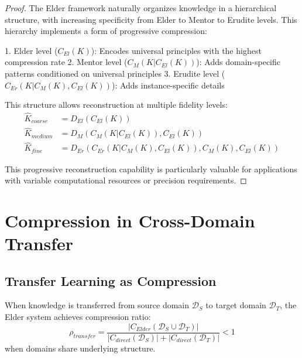 \begin{proof}
The Elder framework naturally organizes knowledge in a hierarchical structure, with increasing specificity from Elder to Mentor to Erudite levels. This hierarchy implements a form of progressive compression:

1. Elder level ($C_{El}(K)$): Encodes universal principles with the highest compression rate
2. Mentor level ($C_{M}(K | C_{El}(K))$): Adds domain-specific patterns conditioned on universal principles
3. Erudite level ($C_{Er}(K | C_{M}(K), C_{El}(K))$): Adds instance-specific details

This structure allows reconstruction at multiple fidelity levels:
\begin{align}
\hat{K}_{coarse} &= D_{El}(C_{El}(K)) \\
\hat{K}_{medium} &= D_{M}(C_{M}(K | C_{El}(K)), C_{El}(K)) \\
\hat{K}_{fine} &= D_{Er}(C_{Er}(K | C_{M}(K), C_{El}(K)), C_{M}(K), C_{El}(K))
\end{align}

This progressive reconstruction capability is particularly valuable for applications with variable computational resources or precision requirements.
\end{proof}

\section{Compression in Cross-Domain Transfer}

\subsection{Transfer Learning as Compression}

\begin{theorem}
When knowledge is transferred from source domain $\mathcal{D}_S$ to target domain $\mathcal{D}_T$, the Elder system achieves compression ratio:
\begin{equation}
\rho_{transfer} = \frac{|C_{Elder}(\mathcal{D}_S \cup \mathcal{D}_T)|}{|C_{direct}(\mathcal{D}_S)| + |C_{direct}(\mathcal{D}_T)|} < 1
\end{equation}
when domains share underlying structure.
\end{theorem}

